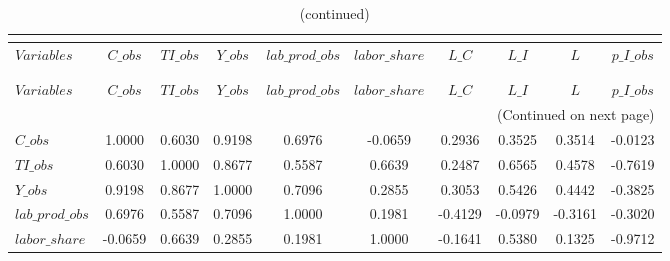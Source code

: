  
\begin{center}
\begin{longtable}{lccccccccc} 
\caption{MATRIX OF CORRELATIONS}\\
 \label{Table:th_corr_matrix}\\
\toprule 
$Variables       $	 & 	 $           C\_obs$	 & 	 $          TI\_obs$	 & 	 $           Y\_obs$	 & 	 $  lab\_prod\_obs$	 & 	 $     labor\_share$	 & 	 $             L\_C$	 & 	 $             L\_I$	 & 	 $                 L$	 & 	 $       p\_I\_obs$\\
\midrule \endfirsthead 
\caption{(continued)}\\
 \toprule \\ 
$Variables       $	 & 	 $           C\_obs$	 & 	 $          TI\_obs$	 & 	 $           Y\_obs$	 & 	 $  lab\_prod\_obs$	 & 	 $     labor\_share$	 & 	 $             L\_C$	 & 	 $             L\_I$	 & 	 $                 L$	 & 	 $       p\_I\_obs$\\
\midrule \endhead 
\midrule \multicolumn{10}{r}{(Continued on next page)} \\ \bottomrule \endfoot 
\bottomrule \endlastfoot 
$C\_obs          $	 & 	            1.0000	 & 	            0.6030	 & 	            0.9198	 & 	            0.6976	 & 	           -0.0659	 & 	            0.2936	 & 	            0.3525	 & 	            0.3514	 & 	           -0.0123 \\ 
$TI\_obs         $	 & 	            0.6030	 & 	            1.0000	 & 	            0.8677	 & 	            0.5587	 & 	            0.6639	 & 	            0.2487	 & 	            0.6565	 & 	            0.4578	 & 	           -0.7619 \\ 
$Y\_obs          $	 & 	            0.9198	 & 	            0.8677	 & 	            1.0000	 & 	            0.7096	 & 	            0.2855	 & 	            0.3053	 & 	            0.5426	 & 	            0.4442	 & 	           -0.3825 \\ 
$lab\_prod\_obs  $	 & 	            0.6976	 & 	            0.5587	 & 	            0.7096	 & 	            1.0000	 & 	            0.1981	 & 	           -0.4129	 & 	           -0.0979	 & 	           -0.3161	 & 	           -0.3020 \\ 
$labor\_share    $	 & 	           -0.0659	 & 	            0.6639	 & 	            0.2855	 & 	            0.1981	 & 	            1.0000	 & 	           -0.1641	 & 	            0.5380	 & 	            0.1325	 & 	           -0.9712 \\ 

\end{longtable}
\end{center}
